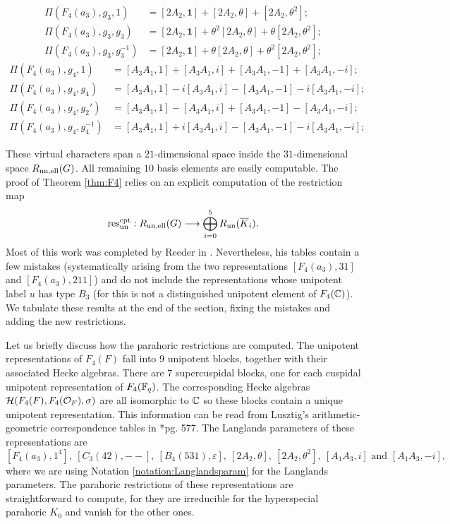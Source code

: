 \begin{align*}
    \Pi(F_4(a_3), g_3, 1) &= [2A_2,\mathbf{1}] + [2A_2,\theta] + [2A_2,\theta^2]; \\
    \Pi(F_4(a_3), g_3, g_3) &= [2A_2,\mathbf{1}] + \theta^2[2A_2,\theta] + \theta[2A_2,\theta^2]; \\
    \Pi(F_4(a_3), g_3, g_3^{-1}) &= [2A_2,\mathbf{1}] + \theta[2A_2,\theta] + \theta^2[2A_2,\theta^2];
\end{align*}
\begin{align*}
    \Pi(F_4(a_3), g_4, 1) &= [A_3A_1,1] + [A_3A_1,i] + [A_3A_1,-1] + [A_3A_1,-i]; \\
    \Pi(F_4(a_3), g_4, g_4) &= [A_3A_1,1] - i[A_3A_1,i] - [A_3A_1,-1] - i[A_3A_1,-i]; \\
    \Pi(F_4(a_3), g_4, g_2') &= [A_3A_1,1] - [A_3A_1,i] + [A_3A_1,-1] - [A_3A_1,-i]; \\
    \Pi(F_4(a_3), g_4, g_4^{-1}) &= [A_3A_1,1] + i[A_3A_1,i] - [A_3A_1,-1] - i[A_3A_1,-i];
\end{align*}

These virtual characters span a $21$-dimensional space inside the $31$-dimensional space $R_{\mathrm{un},\text{ell}}(G)$. All remaining $10$ basis elements are easily computable. The proof of Theorem \ref{thm:F4} relies on an explicit computation of the restriction map 
$$\mathrm{res}^{\mathrm{cpt}}_{\mathrm{un}}:R_{\mathrm{un},\mathrm{ell}}(G)\longrightarrow\bigoplus_{i=0}^5 R_{\mathrm{un}}(\overline{K}_i).$$
Most of this work was completed by Reeder in \cite{Reeder2000}. Nevertheless, his tables contain a few mistakes (systematically arising from the two representations $[F_4(a_3),31]$ and $[F_4(a_3),211]$) and do not include the representations whose unipotent label $u$ has type $B_3$ (for this is not a distinguished unipotent element of $F_4(\mathbb{C})$). We tabulate these results at the end of the section, fixing the mistakes and adding the new restrictions.

Let us briefly discuss how the parahoric restrictions are computed. The unipotent representations of $F_4(F)$ fall into $9$ unipotent blocks, together with their associated Hecke algebras. There are $7$ supercuspidal blocks, one for each cuspidal unipotent representation of $F_4(\mathbb{F}_q)$. The corresponding Hecke algebras $\mathcal{H}(F_4(F),F_4(\mathcal{O}_F),\sigma)$ are all isomorphic to $\mathbb{C}$ so these blocks contain a unique unipotent representation. This information can be read from Lusztig's arithmetic-geometric correspondence tables in \cite{Lusztig1995}*{pg. 577}. The Langlands parameters of these representations are $$[F_4(a_3),1^4],\ [C_3(42),--],\ [B_4(531),\varepsilon],\ [2A_2,\theta],\ [2A_2,\theta^2],\ [A_1A_3,i]\text{ and }[A_1A_3,-i],$$
where we are using Notation \ref{notation:Langlandsparam} for the Langlands parameters. The parahoric restrictions of these representations are straightforward to compute, for they are irreducible for the hyperspecial parahoric $K_0$ and vanish for the other ones.

